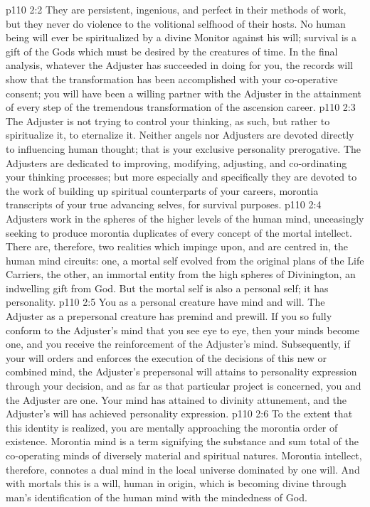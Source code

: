 \vs p110 2:2 They are persistent, ingenious, and perfect in their methods of work, but they never do violence to the volitional selfhood of their hosts. No human being will ever be spiritualized by a divine Monitor against his will; survival is a gift of the Gods which must be desired by the creatures of time. In the final analysis, whatever the Adjuster has succeeded in doing for you, the records will show that the transformation has been accomplished with your co\hyp{}operative consent; you will have been a willing partner with the Adjuster in the attainment of every step of the tremendous transformation of the ascension career.
\vs p110 2:3 \pc The Adjuster is not trying to control your thinking, as such, but rather to spiritualize it, to eternalize it. Neither angels nor Adjusters are devoted directly to influencing human thought; that is your exclusive personality prerogative. The Adjusters are dedicated to improving, modifying, adjusting, and co\hyp{}ordinating your thinking processes; but more especially and specifically they are devoted to the work of building up spiritual counterparts of your careers, morontia transcripts of your true advancing selves, for survival purposes.
\vs p110 2:4 Adjusters work in the spheres of the higher levels of the human mind, unceasingly seeking to produce morontia duplicates of every concept of the mortal intellect. There are, therefore, two realities which impinge upon, and are centred in, the human mind circuits: one, a mortal self evolved from the original plans of the Life Carriers, the other, an immortal entity from the high spheres of Divinington, an indwelling gift from God. But the mortal self is also a personal self; it has personality.
\vs p110 2:5 \pc You as a personal creature have mind and will. The Adjuster as a prepersonal creature has premind and prewill. If you so fully conform to the Adjuster’s mind that you see eye to eye, then your minds become one, and you receive the reinforcement of the Adjuster’s mind. Subsequently, if your will orders and enforces the execution of the decisions of this new or combined mind, the Adjuster’s prepersonal will attains to personality expression through your decision, and as far as that particular project is concerned, you and the Adjuster are one. Your mind has attained to divinity attunement, and the Adjuster’s will has achieved personality expression.
\vs p110 2:6 To the extent that this identity is realized, you are mentally approaching the morontia order of existence. Morontia mind is a term signifying the substance and sum total of the co\hyp{}operating minds of diversely material and spiritual natures. Morontia intellect, therefore, connotes a dual mind in the local universe dominated by one will. And with mortals this is a will, human in origin, which is becoming divine through man’s identification of the human mind with the mindedness of God.
